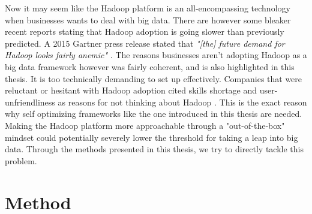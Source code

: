 \documentclass[a4paper,english]{report}
\begin{document}
		Now it may seem like the Hadoop platform is an all-encompassing 
		technology when businesses wants to deal with big data. There are however some bleaker recent reports stating that Hadoop adoption is going slower than previously predicted. A 2015 Gartner press release stated that \textit{"[the] future demand for Hadoop looks fairly anemic"} \cite{Gartner}. The reasons businesses aren't adopting Hadoop as a big data framework however was fairly coherent, and is also highlighted in this thesis. It is too technically demanding to set up effectively. Companies that were reluctant or hesitant with Hadoop adoption cited skills shortage and user-unfriendliness as reasons for not thinking about Hadoop \cite{Gartner}. This is the exact reason why self optimizing frameworks like the one introduced in this thesis are needed. Making the Hadoop platform more approachable through a "out-of-the-box" mindset could potentially severely lower the threshold for taking a leap into big data. Through the methods presented in this thesis, we try to directly tackle this problem.
	
	\chapter{Method}
	\label{chap:method}
		
\end{document}
